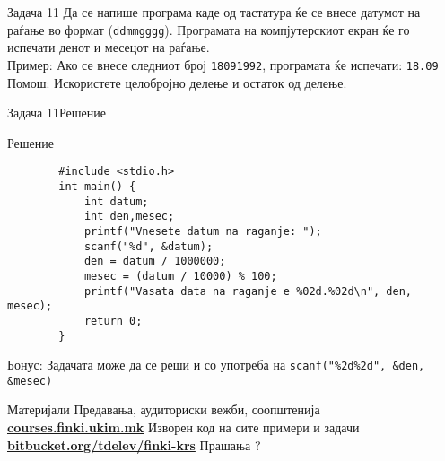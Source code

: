 \begin{frame}[fragile]{Задача 11}
Да се напише програма каде од тастатура ќе се внесе датумот на раѓање во формат (\texttt{ddmmgggg}). Програмата на компјутерскиот екран ќе го испечати денот и месецот на раѓање.\\
Пример: Ако се внесе следниот број \texttt{18091992}, програмата ќе испечати: \texttt{18.09}\\
Помош: Искористете целобројно делење и остаток од делење.
\end{frame}

\begin{frame}[fragile]{Задача 11}{Решение}
	\begin{exampleblock}{Решение}
		\begin{lstlisting}
		#include <stdio.h>		
		int main() {
		    int datum;
		    int den,mesec;
		    printf("Vnesete datum na raganje: ");
		    scanf("%d", &datum);
		    den = datum / 1000000;
		    mesec = (datum / 10000) % 100;
		    printf("Vasata data na raganje e %02d.%02d\n", den, mesec);
		    return 0;
		}
		\end{lstlisting}
	\end{exampleblock}
	Бонус: Задачата може да се реши и со употреба на \texttt{scanf("\%2d\%2d", \&den, \&mesec)}
\end{frame}

\begin{frame}{Материјали}{}
	Предавања, аудиториски вежби, соопштенија\\
	\href{http://courses.finki.ukim.mk/}{\textbf{courses.finki.ukim.mk}}
	\vfill
	Изворен код на сите примери и задачи\\
	\href{http://bitbucket.org/tdelev/finki-krs/}{\textbf{bitbucket.org/tdelev/finki-krs}}
	\vfill
	{\Huge Прашања ?}
\end{frame}


